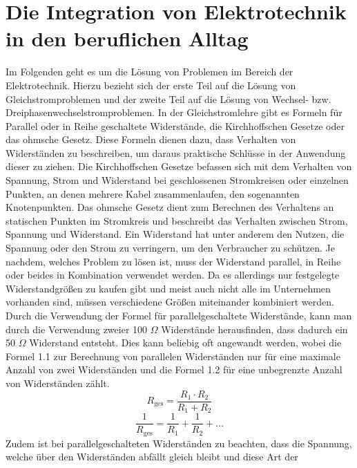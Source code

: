 \section{Die Integration von Elektrotechnik in den beruflichen Alltag}

Im Folgenden geht es um die Lösung von Problemen im Bereich der Elektrotechnik. Hierzu bezieht sich der erste Teil auf die Lösung von Gleichstromproblemen und der 
zweite Teil auf die Lösung von Wechsel- bzw. Dreiphasenwechselstromproblemen. In der Gleichstromlehre gibt es \zB Formeln für Parallel oder in Reihe 
geschaltete Widerstände, die Kirchhoffschen Gesetze oder das ohmsche 
Gesetz. Diese Formeln dienen dazu, dass Verhalten von Widerständen zu beschreiben, um daraus praktische Schlüsse in der Anwendung dieser zu ziehen. 
Die Kirchhoffschen Gesetze befassen sich mit dem Verhalten von Spannung, Strom und Widerstand bei geschlossenen Stromkreisen oder einzelnen Punkten, an denen 
mehrere Kabel zusammenlaufen, den sogenannten Knotenpunkten. Das ohmsche Gesetz dient zum Berechnen des Verhaltens an statischen Punkten im Stromkreis und 
beschreibt das Verhalten zwischen Strom, Spannung und Widerstand. Ein Widerstand hat unter anderem den Nutzen, die Spannung oder den Strom zu verringern, um 
den Verbraucher zu schützen. Je nachdem, welches Problem zu lösen ist, muss der Widerstand parallel, in Reihe oder beides in Kombination verwendet werden. 
Da es allerdings nur festgelegte Widerstandgrößen zu kaufen gibt und meist auch nicht alle im Unternehmen vorhanden sind, müssen verschiedene Größen miteinander
kombiniert werden. Durch die Verwendung der Formel für parallelgeschaltete Widerstände, kann man \zB durch die Verwendung zweier 100 $\Omega$ Widerstände 
herausfinden, dass dadurch ein 50 $\Omega$ Widerstand entsteht. 
Dies kann beliebig oft angewandt werden, wobei die Formel 1.1 zur Berechnung von parallelen Widerständen nur für eine maximale Anzahl von zwei 
Widerständen und die Formel 1.2 für eine unbegrenzte Anzahl von Widerständen zählt.
\begin{equation}
R_{\text{ges}}=\frac{R_1 \cdot R_2}{R_1+R_2}
\label{eqn:Parallelschaltung von 2 Widerständen}
\end{equation}
\begin{equation}
\frac{1}{R_{\text{ges}}}=\frac{1}{R_1}+\frac{1}{R_2}+\dots
\label{eqn:Parallelschaltung von mehreren Widerständen}
\end{equation}
Zudem ist bei parallelgeschalteten Widerständen zu beachten, dass die Spannung, welche über den Widerständen abfällt gleich bleibt und diese Art der 
